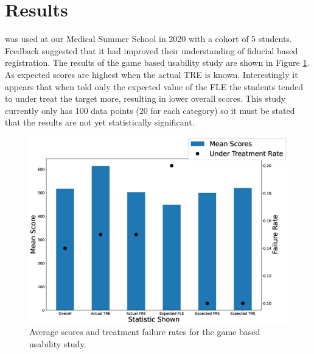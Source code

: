 \section{Results}
\fred\cite{stephen_thompson_2020_3946090} was used at our Medical Summer School in 2020 with a cohort of 5 students. Feedback suggested that it had improved their understanding
of fiducial based registration. The results of the game based usability study are shown in Figure \ref{fig:usability}. As expected scores are 
highest when the actual \gls{TRE} is known. Interestingly it appears that when told only the expected value of the \gls{FLE} the students
tended to under treat the target more, resulting in lower overall scores. This study currently only has 100 data points (20 for each category)
so it must be stated that the results are not yet statistically significant. 

\begin{figure}
        \begin{center}
        \includegraphics[width=0.7\linewidth]{usability.eps}
                \caption{\label{fig:usability}Average scores and treatment failure rates for the game based usability study.}
	\end{center}
\end{figure}


